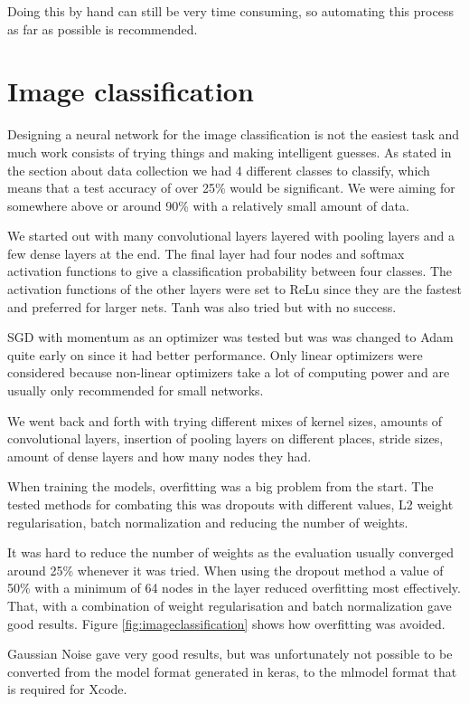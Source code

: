 Doing this by hand can still be very time consuming, so automating this process as far as possible is recommended.

\section{Image classification}
\label{sec:NNclassification}
Designing a neural network for the image classification is not the easiest task and much
work consists of trying things and making intelligent guesses.
As stated in the section about data collection we had 4 different classes to classify,
which means that a test accuracy of over 25\% would be significant. We were aiming for
somewhere above or around 90\% with a relatively small amount of data.

We started out with many convolutional layers layered with pooling layers and a few dense
layers at the end. The final layer had four nodes and softmax activation functions to give a
classification probability between four classes.
The activation functions of the other layers were set to ReLu since they are the fastest
and preferred for larger nets. Tanh was also tried but with no success.

SGD with momentum as an optimizer was tested but was was changed to Adam
quite early on since it had better performance.
Only linear optimizers were considered because non-linear optimizers take a lot of
computing power and are usually only recommended for small networks.

We went back and forth with trying different mixes of kernel sizes, amounts of convolutional
layers, insertion of pooling layers on different places, stride sizes, amount of dense layers
and how many nodes they had.

When training the models, overfitting was a big problem from the start. The tested methods
for combating this was dropouts with different values, L2 weight regularisation,
batch normalization and reducing the number of weights.

It was hard to reduce the number of weights as the evaluation usually converged around 25\%
whenever it was tried.
When using the dropout method a value of 50\% with a minimum of 64 nodes in the layer
reduced overfitting most effectively. That, with a combination of weight regularisation and batch 
normalization gave good results. Figure \ref{fig:imageclassification} shows how overfitting was avoided.

Gaussian Noise gave very good results, but was unfortunately not possible to be 
converted from the model format generated in keras, to the mlmodel format that is required for Xcode.


